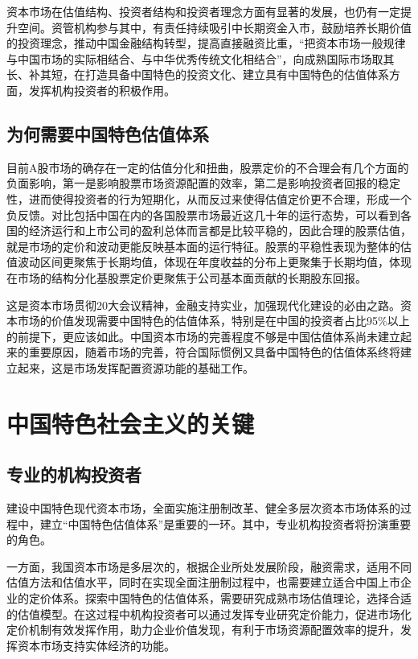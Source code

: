 \documentclass{ctexart}
\begin{document}
资本市场在估值结构、投资者结构和投资者理念方面有显著的发展，也仍有一定提升空间。资管机构参与其中，有责任持续吸引中长期资金入市，鼓励培养长期价值的投资理念，推动中国金融结构转型，提高直接融资比重，“把资本市场一般规律与中国市场的实际相结合、与中华优秀传统文化相结合”，向成熟国际市场取其长、补其短，在打造具备中国特色的投资文化、建立具有中国特色的估值体系方面，发挥机构投资者的积极作用。

\subsection*{为何需要中国特色估值体系}
目前A股市场的确存在一定的估值分化和扭曲，股票定价的不合理会有几个方面的负面影响，第一是影响股票市场资源配置的效率，第二是影响投资者回报的稳定性，进而使得投资者的行为短期化，从而反过来使得估值定价更不合理，形成一个负反馈。对比包括中国在内的各国股票市场最近这几十年的运行态势，可以看到各国的经济运行和上市公司的盈利总体而言都是比较平稳的，因此合理的股票估值，就是市场的定价和波动更能反映基本面的运行特征。股票的平稳性表现为整体的估值波动区间更聚焦于长期均值，体现在年度收益的分布上更聚集于长期均值，体现在市场的结构分化基股票定价更聚焦于公司基本面贡献的长期股东回报。

这是资本市场贯彻20大会议精神，金融支持实业，加强现代化建设的必由之路。资本市场的价值发现需要中国特色的估值体系，特别是在中国的投资者占比95\%以上的前提下，更应该如此。中国资本市场的完善程度不够是中国估值体系尚未建立起来的重要原因，随着市场的完善，符合国际惯例又具备中国特色的估值体系终将建立起来，这是市场发挥配置资源功能的基础工作。

\section*{中国特色社会主义的关键}
\subsection*{专业的机构投资者}
建设中国特色现代资本市场，全面实施注册制改革、健全多层次资本市场体系的过程中，建立“中国特色估值体系”是重要的一环。其中，专业机构投资者将扮演重要的角色。

一方面，我国资本市场是多层次的，根据企业所处发展阶段，融资需求，适用不同估值方法和估值水平，同时在实现全面注册制过程中，也需要建立适合中国上市企业的定价体系。探索中国特色的估值体系，需要研究成熟市场估值理论，选择合适的估值模型。在这过程中机构投资者可以通过发挥专业研究定价能力，促进市场化定价机制有效发挥作用，助力企业价值发现，有利于市场资源配置效率的提升，发挥资本市场支持实体经济的功能。
\end{document}
